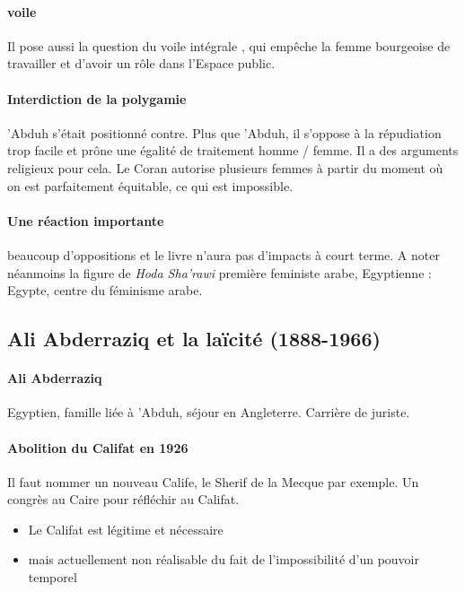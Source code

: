     \paragraph{voile} Il pose aussi la question du voile intégrale , qui empêche la femme bourgeoise de travailler et d'avoir un rôle dans l'Espace public.
    
    \paragraph{Interdiction de la polygamie} 'Abduh s'était positionné contre. Plus que 'Abduh, il s'oppose à la répudiation trop facile et prône une égalité de traitement homme / femme. Il a des arguments religieux pour cela.  Le Coran autorise plusieurs femmes à partir du moment où on est parfaitement équitable, ce qui est impossible. 
    
    \paragraph{Une réaction importante} beaucoup d'oppositions et le livre n'aura pas d'impacts à court terme. A noter néanmoins la figure de \textit{Hoda Sha'rawi} première feministe arabe, Egyptienne : Egypte, centre du féminisme arabe.
  
    
      \subsection{Ali Abderraziq et la laïcité (1888-1966)}
    
    \paragraph{Ali Abderraziq} Egyptien, famille liée à 'Abduh, séjour en Angleterre. Carrière de juriste. 
    
    \paragraph{Abolition du Califat en 1926} Il faut nommer un nouveau Calife, le Sherif de la Mecque par exemple. Un congrès au Caire pour réfléchir au Califat.
    \begin{itemize}
        \item Le Califat est légitime et nécessaire
        \item mais actuellement non réalisable du fait de l'impossibilité d'un pouvoir temporel
    \end{itemize}
  
